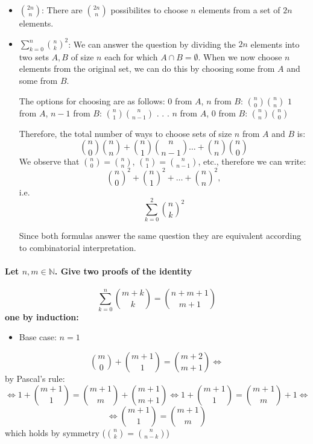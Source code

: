 \documentclass[
]{article}
\providecommand{\tightlist}{%
  \setlength{\itemsep}{0pt}\setlength{\parskip}{0pt}}
\begin{document}
\begin{itemize}
\item
  \(\binom{2n}{n}\): There are \(\binom{2n}{n}\) possibilites to choose
  \(n\) elements from a set of \(2n\) elements.
\item
  \(\sum_{k=0}^n \binom{n}{k}^2\): We can answer the question by
  dividing the \(2n\) elements into two sets \(A,B\) of size \(n\) each
  for which \(A \cap B = \emptyset\). When we now choose \(n\) elements
  from the original set, we can do this by choosing some from \(A\) and
  some from \(B\).

  The options for choosing are as follows: \(0\) from \(A\), \(n\) from
  \(B\): \(\binom{n}{0} \binom{n}{n}\) \(1\) from \(A\), \(n-1\) from
  \(B\): \(\binom{n}{1} \binom{n}{n-1}\) . . . \(n\) from \(A\), \(0\)
  from \(B\): \(\binom{n}{n}\binom{n}{0}\)

  Therefore, the total number of ways to choose sets of size \(n\) from
  \(A\) and \(B\) is: \[
    \binom{n}{0}\binom{n}{n} + \binom{n}{1} \binom{n}{n-1} \dots + \binom{n}{n}\binom{n}{0}
    \] We observe that \(\binom{n}{0} = \binom{n}{n}\),
  \(\binom{n}{1} = \binom{n}{n-1}\), etc., therefore we can write: \[
    \binom{n}{0}^2+\binom{n}{1}^2 + \dots + \binom{n}{n}^2,
    \] i.e.~\[\sum_{k=0}^2 \binom{n}{k}^2\]

  Since both formulas answer the same question they are equivalent
  according to combinatorial interpretation.
\end{itemize}

\hypertarget{let-nm-in-mathbbn.-give-two-proofs-of-the-identity}{%
\paragraph{\texorpdfstring{Let \(n,m \in \mathbb{N}\). Give two proofs
of the
identity}{Let n,m \textbackslash in \textbackslash mathbb\{N\}. Give two proofs of the identity}}\label{let-nm-in-mathbbn.-give-two-proofs-of-the-identity}}

\[
\sum_{k=0}^{n} \binom{m+k}{k} = \binom{n+m+1}{m+1}
\] \textbf{one by induction:}

\begin{itemize}
\tightlist
\item
  Base case: \(n=1\)
\end{itemize}

\[
\binom{m}{0} + \binom{m+1}{1} = \binom{m+2}{m+1} \Leftrightarrow
\] by Pascal's rule: \[
\Leftrightarrow 1 + \binom{m+1}{1} = \binom{m+1}{m} + \binom{m+1}{m+1} \Leftrightarrow 1+ \binom{m+1}{1} = \binom{m+1}{m} + 1 \Leftrightarrow
\] \[
\Leftrightarrow \binom{m+1}{1} = \binom{m+1}{m}
\] which holds by symmetry (\(\binom{n}{k} = \binom{n}{n-k}\))
\end{document}
